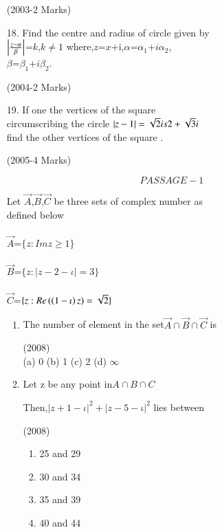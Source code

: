 \documentclass[journal]{IEEEtran}
\theoremstyle{remark}
\begin{document}
\begin{enumerate}
   \hfill (2003-2 Marks)\\
\item[18.] Find the centre and radius  of circle given by\\
    $\left\vert\frac{z-\alpha} \beta\right\vert$=$k$,$k\not=1$ 
where,$z$=$x$+i,$\alpha$=$\alpha_1$+$i\alpha_2$, \\
    $\beta$=$\beta_1$+$i\beta_2$. 
    
    \hfill(2004-2 Marks) \\
      
\item[19.] If one the vertices of the square \\
circumscribing the circle $\left\vert z-1\right\vert = \sqrt{2} is 2 +\sqrt{3} i $ \\
      
      
find the other vertices of the square .

\hfill (2005-4 Marks) \\
\newpage



$$PASSAGE-1$$


      Let $\vec{A}$,$\vec{B}$,$\vec{C}$ be three sets of complex number as\\ 
  defined below\\\\
$\vec{A}$=$\{z:Im z\geq 1\}$\\\\
$\vec{B}$=$\{z:|z-2-\iota|=3\}$\\\\
$\vec{C}$=$\{z:Re\left(\left(1-\iota\right)z\right)=\sqrt{2}\}$\\
\begin{enumerate}
        
\item The number of element in the set$\vec{A} \cap\vec{B} \cap\vec{C} $
is 

\hfill (2008)\\
 
   (a) 0 \hfill
   (b) 1 \hfill
   (c) 2 \hfill
   (d) $\infty$

 

\item Let z be any point in$ A\cap B \cap C$

 Then,$|z+1-\iota|^2+|z-5-\iota|^2$ lies between
 
 \hfill  (2008) \\
\begin{multicols}{2}
    \begin{enumerate}
        \item 25 and 29
        \item 30 and 34
        \item 35 and 39
        \item 40 and 44
    \end{enumerate}
\end{multicols}


\end{enumerate}
\end{enumerate}
\end{document}
